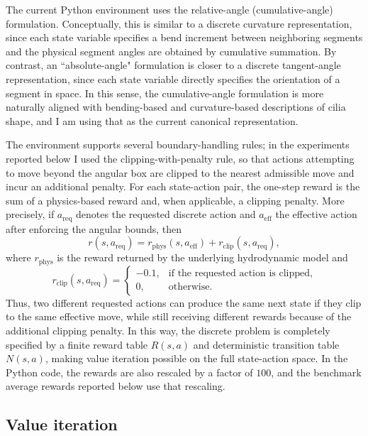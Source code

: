 \documentclass{article}
\begin{document}
The current Python environment uses the relative-angle (cumulative-angle) formulation. Conceptually, this is similar to a discrete curvature representation, since each state variable specifies a bend increment between neighboring segments and the physical segment angles are obtained by cumulative summation. By contrast, an ``absolute-angle" formulation is closer to a discrete tangent-angle representation, since each state variable directly specifies the orientation of a segment in space. In this sense, the cumulative-angle formulation is more naturally aligned with bending-based and curvature-based descriptions of cilia shape, and I am using that as the current canonical representation. 

The environment supports several boundary-handling rules; in the experiments reported below I used the clipping-with-penalty rule, so that actions attempting to move beyond the angular box are clipped to the nearest admissible move and incur an additional penalty. For each state-action pair, the one-step reward is the sum of a physics-based reward and, when applicable, a clipping penalty. More precisely, if $a_{\mathrm{req}}$ denotes the requested discrete action and $a_{\mathrm{eff}}$ the effective action after enforcing the angular bounds, then
\[
r(s,a_{\mathrm{req}})=r_{\mathrm{phys}}(s,a_{\mathrm{eff}})+r_{\mathrm{clip}}(s,a_{\mathrm{req}}),
\]
where $r_{\mathrm{phys}}$ is the reward returned by the underlying hydrodynamic model and
\[
r_{\mathrm{clip}}(s,a_{\mathrm{req}})=
\begin{cases}
-0.1, & \text{if the requested action is clipped},\\
0, & \text{otherwise.}
\end{cases}
\]
Thus, two different requested actions can produce the same next state if they clip to the same effective move, while still receiving different rewards because of the additional clipping penalty. In this way, the discrete problem is completely specified by a finite reward table $R(s,a)$ and deterministic transition table $N(s,a)$, making value iteration possible on the full state-action space. In the Python code, the rewards are also rescaled by a factor of $100$, and the benchmark average rewards reported below use that rescaling. 

\subsection{Value iteration}
\end{document}

